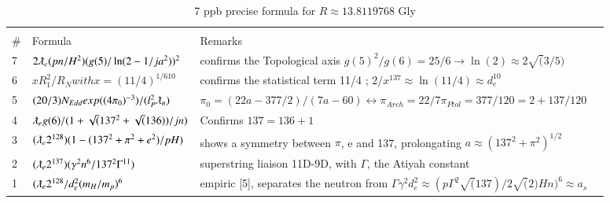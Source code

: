 \documentclass[a4paper,9pt]{article}
\begin{document}
\begin{appendix}
\begin{table}
\caption{7 ppb precise formula for $R \approx 13.8119768$ Gly}
\label{tab:6:table6}
  \hskip-2.0cm\begin{tabular}{llll}
    \toprule
    \multicolumn{3}{c}{}                   \\
    \cmidrule(r){1-3}
    \#     & Formula  & Remarks \\
    \midrule
    
    
   
    7 & $2\lambdabar_{e} (pn/H^{2})(g(5)/\ln(2-1/ja^2))^2$   & confirms the Topological axis $g(5)^2/g(6) = 25/6 \rightarrow \ln(2) \approx 2\sqrt(3/5)$  \\
    
    6 & $xR_1^2/R_N with x = (11/4)^{1/610}$ &  confirms the statistical term 11/4 ; $2/x^{137} \approx \ln(11/4) \approx d_e^{10}$ \\
    
    5 & $(20/3)N_{Edd} exp((4 \pi_0)^{-3})/(l_P^2\lambdabar_n)$ & $\pi_0 =  (22a - 377/2)/(7a - 60) \leftrightarrow \pi_{Arch} = 22/7  \pi_{Ptol} = 377/120 = 2 + 137/120$  \\
    
     4 & $\lambdabar_{e} g(6)/(1+\sqrt(137^2+\sqrt(136))/jn)$  & Confirms $137=136+1$ \\
    3 & $(\lambdabar_{e} 2^{128})(1-(137^2+\pi^2+e^2)/pH)$ & shows a symmetry between $\pi$, e and 137, prolongating $ a \approx (137^2 + \pi^2)^{1/2}$ \\
     2 & $(\lambdabar_{e} 2^{137})(\gamma^2 n^6 / 137^2 \Gamma^{11})$ & superstring liaison 11D-9D, with $\Gamma$, the Atiyah constant \\
    1 & $(\lambdabar_{e} 2^{128}/d_e^2(m_H/m_p)^6$  & empiric [5], separates the neutron from $\Gamma \gamma^2 d_e^2 \approx (p\Gamma^2 \sqrt(137)/2 \sqrt(2) Hn)^6 \approx a_s$ \\
    
    \bottomrule
  \end{tabular}
\end{table}


% 


\end{appendix}
\end{document}
